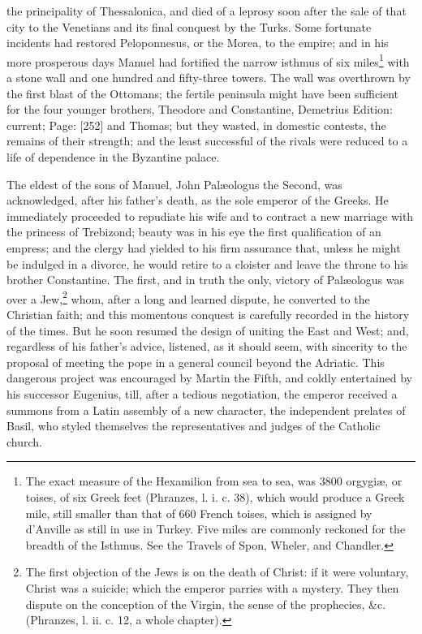 the principality of Thessalonica, and died of a leprosy soon after the sale of that city to the Venetians and its final conquest by the Turks. Some fortunate incidents had restored Peloponnesus, or the Morea, to the empire; and in his more prosperous days Manuel had fortified the narrow isthmus of six miles\footnote{The exact measure of the Hexamilion from sea to sea, was 3800 orgygiæ, or toises, of six Greek feet (Phranzes, l. i. c. 38), which would produce a Greek mile, still smaller than that of 660 French toises, which is assigned by d\texthebrew{}’Anville as still in use in Turkey. Five miles are commonly reckoned for the breadth of the Isthmus. See the Travels of Spon, Wheler, and Chandler.} with a stone wall and one hundred and fifty-three towers. The wall was overthrown by the first blast of the Ottomans; the fertile peninsula might have been sufficient for the four younger brothers, Theodore and Constantine, Demetrius Edition: current; Page: [252] and Thomas; but they wasted, in domestic contests, the remains of their strength; and the least successful of the rivals were reduced to a life of dependence in the Byzantine palace.

The eldest of the sons of Manuel, John Palæologus the Second, was acknowledged, after his father\texthebrew{}’s death, as the sole emperor of the Greeks. He immediately proceeded to repudiate his wife and to contract a new marriage with the princess of Trebizond; beauty was in his eye the first qualification of an empress; and the clergy had yielded to his firm assurance that, unless he might be indulged in a divorce, he would retire to a cloister and leave the throne to his brother Constantine. The first, and in truth the only, victory of Palæologus was over a Jew,\footnote{The first objection of the Jews is on the death of Christ: if it were voluntary, Christ was a suicide; which the emperor parries with a mystery. They then dispute on the conception of the Virgin, the sense of the prophecies, \&c. (Phranzes, l. ii. c. 12, a whole chapter).} whom, after a long and learned dispute, he converted to the Christian faith; and this momentous conquest is carefully recorded in the history of the times. But he soon resumed the design of uniting the East and West; and, regardless of his father\texthebrew{}’s advice, listened, as it should seem, with sincerity to the proposal of meeting the pope in a general council beyond the Adriatic. This dangerous project was encouraged by Martin the Fifth, and coldly entertained by his successor Eugenius, till, after a tedious negotiation, the emperor received a summons from a Latin assembly of a new character, the independent prelates of Basil, who styled themselves the representatives and judges of the Catholic church.

